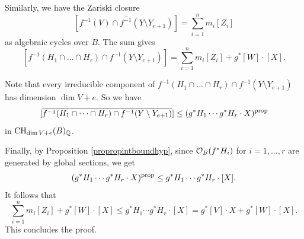 \documentclass[12pt]{amsart}
\begin{document}
Similarly, we have the Zariski closure
$$[\overline{f^{-1}(V)\cap f^{-1}(Y\setminus Y_{e+1})}]
=\sum_{i=1}^n m_i[Z_i]$$
as algebraic cycles over $B$. 
The sum gives 
$$[\overline{f^{-1}(H_1\cap \dots \cap H_r)\cap f^{-1}(Y\setminus Y_{e+1})}]=\sum_{i=1}^n m_i[Z_i]+g^*[W]\cdot [X].$$



Note that every irreducible component of 
$f^{-1}(H_1\cap \dots \cap H_r)\cap f^{-1}(Y\setminus Y_{e+1})$ has dimension $\dim V+e.$
So we have 
$$[\overline{f^{-1}(H_1\cap \dots \cap H_r)\cap f^{-1}(Y\setminus Y_{e+1})}]\leq (g^*H_1\cdots g^*H_r\cdot X)^{{\rm prop}}$$
in ${\rm CH}_{\dim V+e}(B)_{\mathbb Q}$. 

Finally, by Proposition \ref{propropintboundhyp}, since ${\mathcal O}_{B}(f^*H_i)$ for $ i=1,\dots,r$ are generated by global sections, 
we get 
$$(g^*H_1\cdots g^*H_r\cdot X)^{{\rm prop}}\leq g^*H_1\cdots g^*H_r\cdot [X].$$
It follows that
$$\sum_{i=1}^n m_i[Z_i]+g^*[W]\cdot [X]\leq g^*H_1\cdots g^*H_r\cdot [X]=g^*[V]\cdot X+g^*[W]\cdot [X].$$
This concludes the proof.
\endproof
\end{document}
